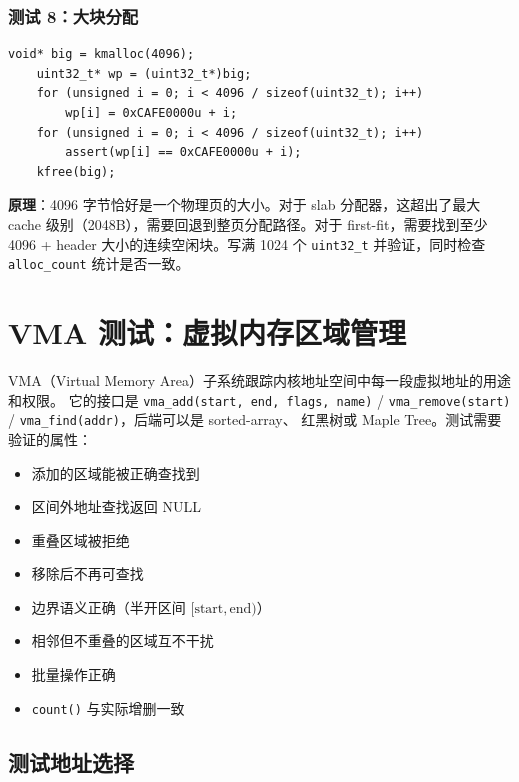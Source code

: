 \subsubsection{测试 8：大块分配}

\begin{lstlisting}[style=cstyle]
    void* big = kmalloc(4096);
    uint32_t* wp = (uint32_t*)big;
    for (unsigned i = 0; i < 4096 / sizeof(uint32_t); i++)
        wp[i] = 0xCAFE0000u + i;
    for (unsigned i = 0; i < 4096 / sizeof(uint32_t); i++)
        assert(wp[i] == 0xCAFE0000u + i);
    kfree(big);
\end{lstlisting}

\textbf{原理}：4096 字节恰好是一个物理页的大小。对于 slab 分配器，这超出了最大
cache 级别（2048B），需要回退到整页分配路径。对于 first-fit，需要找到至少
4096 + header 大小的连续空闲块。写满 1024 个 \texttt{uint32\_t} 并验证，同时检查
\texttt{alloc\_count} 统计是否一致。


\section{VMA 测试：虚拟内存区域管理}
\label{sec:test-vma}

VMA（Virtual Memory Area）子系统跟踪内核地址空间中每一段虚拟地址的用途和权限。
它的接口是 \texttt{vma\_add(start, end, flags, name)} /
\texttt{vma\_remove(start)} / \texttt{vma\_find(addr)}，后端可以是 sorted-array、
红黑树或 Maple Tree。测试需要验证的属性：

\begin{itemize}
  \item 添加的区域能被正确查找到
  \item 区间外地址查找返回 NULL
  \item 重叠区域被拒绝
  \item 移除后不再可查找
  \item 边界语义正确（半开区间 $[\text{start}, \text{end})$）
  \item 相邻但不重叠的区域互不干扰
  \item 批量操作正确
  \item \texttt{count()} 与实际增删一致
\end{itemize}

\subsection{测试地址选择}

